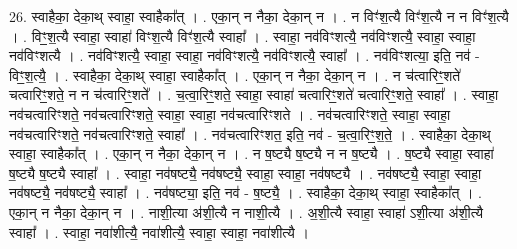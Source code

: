 \documentclass[17pt]{extarticle}
\begin{document}
26. स्वाहैका॒ देका॒थ् स्वाहा॒ स्वाहैका᳚त् । . एका॒न् न नैका॒ देका॒न् न । . न विꣳ॑श॒त्यै विꣳ॑श॒त्यै न न विꣳ॑श॒त्यै । . विꣳ॒॒श॒त्यै स्वाहा॒ स्वाहा॑ विꣳश॒त्यै विꣳ॑श॒त्यै स्वाहा᳚ । . स्वाहा॒ नव॑विꣳशत्यै॒ नव॑विꣳशत्यै॒ स्वाहा॒ स्वाहा॒ नव॑विꣳशत्यै । . नव॑विꣳशत्यै॒ स्वाहा॒ स्वाहा॒ नव॑विꣳशत्यै॒ नव॑विꣳशत्यै॒ स्वाहा᳚ । . नव॑विꣳशत्या॒ इति॒ नव॑ - विꣳ॒॒श॒त्यै॒ । . स्वाहैका॒ देका॒थ् स्वाहा॒ स्वाहैका᳚त् । . एका॒न् न नैका॒ देका॒न् न । . न च॑त्वारिꣳ॒॒शते॑ चत्वारिꣳ॒॒शते॒ न न च॑त्वारिꣳ॒॒शते᳚ । . च॒त्वा॒रिꣳ॒॒शते॒ स्वाहा॒ स्वाहा॑ चत्वारिꣳ॒॒शते॑ चत्वारिꣳ॒॒शते॒ स्वाहा᳚ । . स्वाहा॒ नव॑चत्वारिꣳशते॒ नव॑चत्वारिꣳशते॒ स्वाहा॒ स्वाहा॒ नव॑चत्वारिꣳशते । . नव॑चत्वारिꣳशते॒ स्वाहा॒ स्वाहा॒ नव॑चत्वारिꣳशते॒ नव॑चत्वारिꣳशते॒ स्वाहा᳚ । . नव॑चत्वारिꣳशत॒ इति॒ नव॑ - च॒त्वा॒रिꣳ॒॒श॒ते॒ । . स्वाहैका॒ देका॒थ् स्वाहा॒ स्वाहैका᳚त् । . एका॒न् न नैका॒ देका॒न् न । . न ष॒ष्ट्यै ष॒ष्ट्यै न न ष॒ष्ट्यै । . ष॒ष्ट्यै स्वाहा॒ स्वाहा॑ ष॒ष्ट्यै ष॒ष्ट्यै स्वाहा᳚ । . स्वाहा॒ नव॑षष्ट्यै॒ नव॑षष्ट्यै॒ स्वाहा॒ स्वाहा॒ नव॑षष्ट्यै । . नव॑षष्ट्यै॒ स्वाहा॒ स्वाहा॒ नव॑षष्ट्यै॒ नव॑षष्ट्यै॒ स्वाहा᳚ । . नव॑षष्ट्या॒ इति॒ नव॑ - ष॒ष्ट्यै॒ । . स्वाहैका॒ देका॒थ् स्वाहा॒ स्वाहैका᳚त् । . एका॒न् न नैका॒ देका॒न् न । . नाशी॒त्या अ॑शी॒त्यै न नाशी॒त्यै । . अ॒शी॒त्यै स्वाहा॒ स्वाहा॑ ऽशी॒त्या अ॑शी॒त्यै स्वाहा᳚ । . स्वाहा॒ नवा॑शीत्यै॒ नवा॑शीत्यै॒ स्वाहा॒ स्वाहा॒ नवा॑शीत्यै । \newline
\end{document}
